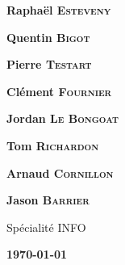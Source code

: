 \pagestyle{empty}
\selectfont


\def\mate#1{\textbf{\color{white}\large #1}}


\hspace{-0.75cm}
\begin{minipage}{21cm}

\noindent {}

\vspace{-27.6cm}
\hspace{12cm}\begin{minipage}{8cm}
\begin{flushright}


\mate{Raphaël \textsc{Esteveny}}

\vspace{3mm}
\mate{Quentin \textsc{Bigot}}

\vspace{3mm}
\mate{Pierre \textsc{Testart}}

\vspace{3mm}
\mate{Clément \textsc{Fournier}}

\vspace{3mm}
\mate{Jordan \textsc{Le Bongoat}}

\vspace{3mm}
\mate{Tom \textsc{Richardon}}

\vspace{3mm}
\mate{Arnaud \textsc{Cornillon}}

\vspace{3mm}
\mate{Jason \textsc{Barrier}}

\vspace{5mm}
{\color{white}Spécialité INFO}

\vspace{1mm}
\end{flushright}
\end{minipage}
\end{minipage}

\vspace{12.7cm}
\hspace{7cm}\begin{minipage}{11cm}
\noindent \Huge\bfseries \thetitle
	\baselineskip=20pt
    
 
{\Large \bfseries\color{gray} \today}
	
\end{minipage}


%

\newpage
\restoregeometry

